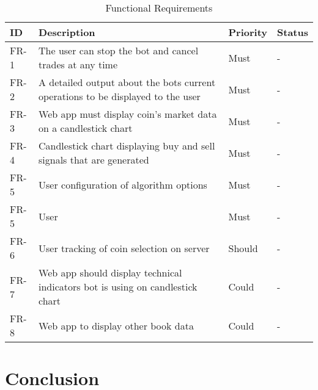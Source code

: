 \begin{table}[htb!]
\centering
\begin{tabular}{|l|p{}|l|l|}
\hline
\textbf{ID} & \textbf{Description} & \textbf{Priority} & \textbf{Status} \\ \hline\hline
FR-1 & The user can stop the bot and cancel trades at any time & Must & - \\ \hline
FR-2 & A detailed output about the bots current operations to be displayed to the user & Must & - \\ \hline
FR-3 & Web app must display coin's market data on a candlestick chart & Must & - \\\hline
FR-4 & Candlestick chart displaying buy and sell signals that are generated & Must & - \\\hline
FR-5 & User configuration of algorithm options & Must & - \\ \hline
FR-5 & User  & Must & - \\ \hline
FR-6 & User tracking of coin selection on server & Should & - \\ \hline
FR-7 & Web app should display technical indicators bot is using on candlestick chart & Could & - \\\hline
FR-8 & Web app to display other book data & Could & - \\\hline
\end{tabular}
\caption{Functional Requirements}
\label{table:requirements:func}
\end{table}





\section{Conclusion}
\label{sec:requirements:conclusion}
